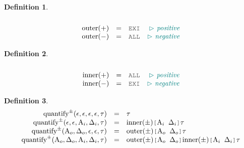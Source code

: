 \documentclass[acmsmall]{acmart}
\theoremstyle{definition}
\newtheorem{definition}{Definition}[section]
\begin{document}
\begin{definition}
  \[\begin{array}{rclr}
    \\
    \text{outer}(+) 
    &=& 
    \J{EXI} 
    & \C{positive} 
    \\
    \text{outer}(-) 
    &=& 
    \J{ALL} 
    & \C{negative} 
  \end{array}\]
\end{definition}

\begin{definition}
  \[\begin{array}{rclr}
    \\
    \text{inner}(+) 
    &=& 
    \J{ALL} 
    & \C{positive} 
    \\
    \text{inner}(-) 
    &=& 
    \J{EXI} 
    & \C{negative} 
  \end{array}\]
\end{definition}

\begin{definition}
  \[\begin{array}{rclr}
    \text{quantify}^{\pm}(\epsilon, \epsilon, \epsilon, \epsilon, \tau) 
    &=& 
    \tau
    \\
    \text{quantify}^{\pm}(\epsilon, \epsilon, \Alpha_i, \Delta_i, \tau) 
    &=& 
    \text{inner}(\pm)\J{[}\Alpha_i\J{ }\Delta_i\J{]}\tau
    \\
    \text{quantify}^{\pm}(\Alpha_o, \Delta_o, \epsilon, \epsilon, \tau) 
    &=& 
    \text{outer}(\pm)\J{[}\Alpha_o\J{ }\Delta_o\J{]}\tau
    \\
    \text{quantify}^{\pm}(\Alpha_o, \Delta_o, \Alpha_i, \Delta_i, \tau) 
    &=& 
    \text{outer}(\pm)\J{[}\Alpha_o\J{ }\Delta_o\J{]}
    \text{inner}(\pm)\J{[}\Alpha_i\J{ }\Delta_i\J{]}
    \tau
  \end{array}\]
\end{definition}
\end{document}
